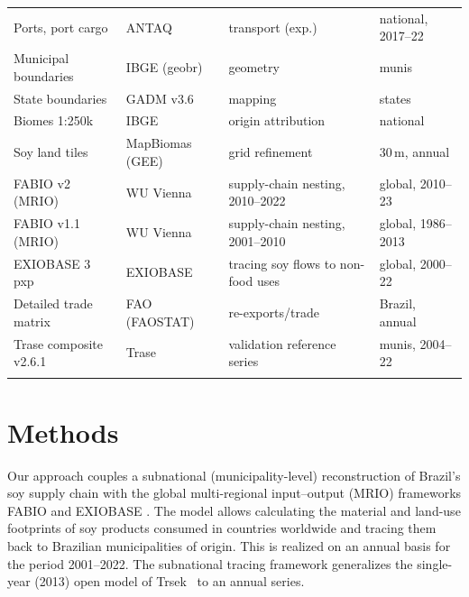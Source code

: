 \documentclass[pdflatex,sn-nature]{sn-jnl}%
\begin{document}
\begin{table}[htbp]
\begin{tabular}{@{}p{3.5cm}p{2.3cm}p{3.0cm}p{2.6cm}@{}}
Ports, port cargo                  & ANTAQ               & transport (exp.)      & national, 2017--22 \\
Municipal boundaries               & IBGE (geobr)        & geometry              & munis \\
State boundaries                   & GADM v3.6           & mapping               & states \\
Biomes 1:250k                      & IBGE                & origin attribution    & national \\
Soy land tiles                     & MapBiomas (GEE)     & grid refinement       & 30\,m, annual \\
FABIO v2 (MRIO)                    & WU Vienna           & supply-chain nesting, 2010--2022 & global, 2010--23 \\
FABIO v1.1 (MRIO)                  & WU Vienna           & supply-chain nesting, 2001--2010 & global, 1986--2013 \\
EXIOBASE 3 pxp                     & EXIOBASE            & tracing soy flows to non-food uses    & global, 2000--22 \\
Detailed trade matrix              & FAO (FAOSTAT)       & re-exports/trade      & Brazil, annual \\
Trase composite v2.6.1             & Trase               & validation reference series  & munis, 2004--22 \\
\botrule
\end{tabular}
\end{table}


\clearpage

\section{Methods}\label{sec:methods}

Our approach couples a subnational (municipality-level) reconstruction of Brazil's soy
supply chain with the global multi-regional input--output
(MRIO) frameworks FABIO \cite{bruckner2019fabio} and EXIOBASE \cite{stadler2018exiobase}. The model allows calculating the material and land-use footprints of soy products consumed in countries worldwide and tracing them back to Brazilian municipalities of origin.
This is realized on an annual basis for the period 2001--2022. The subnational
tracing framework generalizes the single-year (2013) open model of
Trsek~\cite{trsek2022} to an annual series.
\end{document}
